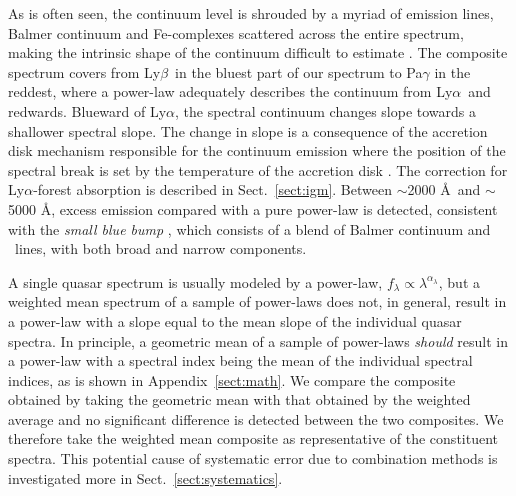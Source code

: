 \documentclass{aa}    %
\newcommand{\figlabel}[1]{\label{fig:#1}}
\newcommand{\sectionname}{Sect.}
\newcommand{\Sect}[1]{\sectionname~\ref{sect:#1}}
\newcommand{\sect}[1]{\Sect{#1}}
\newcommand{\App}[1]{Appendix~\ref{sect:#1}}
\newcommand{\lya}{Ly$\alpha$}
\newcommand{\lyb}{Ly$\beta$}
\newcommand{\feii}{\ion{Fe}{ii}}
\begin{document}


As is often seen, the continuum level is shrouded by a myriad of emission lines,
Balmer continuum and Fe-complexes scattered across the entire spectrum, making
the intrinsic shape of the continuum difficult to estimate \citep{Elvis2001}. 
The composite spectrum covers from \lyb ~in the bluest part of our spectrum to
Pa$\gamma$ in the reddest, where a power-law adequately describes the
continuum from \lya~and redwards. Blueward of \lya, the spectral
continuum changes slope towards a shallower spectral slope. The change in slope
is a consequence of the accretion disk mechanism responsible for the continuum
emission where the position of the spectral break is set by the temperature of the
accretion disk \citep{Pereyra2006}. The correction for \lya-forest absorption is
described in \sect{igm}.
Between $\sim$2000 \AA~and $\sim$5000 \AA, excess emission compared with a
pure power-law is detected, consistent with the \textit{small blue bump}
\citep{Wills1985}, which consists of a blend of Balmer continuum and \feii
~lines, with both broad and narrow components.

 A single quasar spectrum is usually modeled by a power-law, $f_{\lambda}
\propto \lambda^{\alpha_{\lambda}}$, but a weighted mean spectrum of a sample of power-laws
does not, in general, result in a power-law with a slope equal to the mean slope of
the individual quasar spectra. In principle, a geometric mean of a sample of power-laws
\textit{should} result in a power-law with a spectral index being the mean of the individual spectral indices, as is shown in
\App{math}. We compare the composite obtained by taking the geometric mean with
that obtained by the weighted average and no significant difference is detected
between the two composites. We therefore take the weighted mean composite as
representative of the constituent spectra. This potential cause of systematic
error due to combination methods is investigated more in \sect{systematics}.
\end{document}
